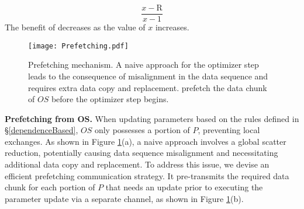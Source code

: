 \[ \frac{x - \text{R}}{x - 1} \]
The benefit of \SysName decreases as the value of \( x \) increases.


\begin{figure}[t]
    \centering
    \texttt{[image: Prefetching.pdf]}
    \caption{Prefetching mechanism. A naive approach for the optimizer step leads to the consequence of misalignment in the data sequence and requires extra data copy and replacement. \SysName prefetch the data chunk of $OS$ before the optimizer step begins.}
    \label{prefetching}
\end{figure}

\noindent\textbf{Prefetching from OS.}
\label{subsec_prefetch}
When updating parameters based on the rules defined in \S\ref{dependenceBased}, $OS$ only possesses a portion of $P$, preventing local exchanges. As shown in Figure \ref{prefetching}(a), a naive approach involves a global scatter reduction, potentially causing data sequence misalignment and necessitating additional data copy and replacement. 
To address this issue, we devise an efficient prefetching communication strategy. It pre-transmits the required data chunk for each portion of $P$ that needs an update prior to executing the parameter update via a separate channel, as shown in Figure \ref{prefetching}(b).


